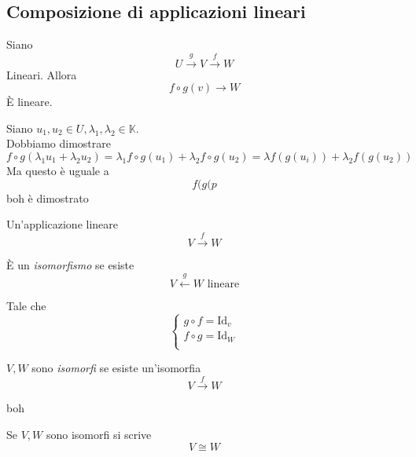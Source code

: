 \subsection{Composizione di applicazioni lineari}

\begin{proprieta}
Siano
\begin{equation}
    U\xrightarrow{g}V\xrightarrow{f}W
\end{equation}
Lineari. Allora
\begin{equation}
    f \circ g(v)\to W
\end{equation}
È lineare.
\end{proprieta}

\begin{dimostrazione}
    Siano $u_{1},u_2 \in U, \lambda_1, \lambda_2\in \mathbb{K}$. \\
    Dobbiamo dimostrare
    \begin{equation}
        f\circ g(\lambda_1u_1 + \lambda_2 u_2) = \lambda_1 f\circ g(u_1)+\lambda_2f\circ g(u_2)=\lambda f(g(u_i))+\lambda_2f(g(u_2))
    \end{equation}
    Ma questo è uguale a
    \begin{equation}
        f(g(p
    \end{equation}
    boh è dimostrato
\end{dimostrazione}

\begin{definizione}

    Un'applicazione lineare
    \begin{equation}
        V \xrightarrow{f} W
    \end{equation}

    È un \textit{isomorfismo} se esiste
    \begin{equation}
        V \xleftarrow{g} W \text{ lineare}
    \end{equation}

    Tale che
    \begin{equation}
        \begin{cases}
            g\circ f= \text{Id}_v \\
            f\circ g= \text{Id}_W \\
        \end{cases}
    \end{equation}
\end{definizione}

\begin{definizione}
    $V,W$ sono \textit{isomorfi} se esiste un'isomorfia
    \begin{equation*}
        V\xrightarrow{f} W
    \end{equation*}
\end{definizione}

\begin{osservazione}
    boh
\end{osservazione}

\begin{notazione}
    Se $V,W$ sono isomorfi si scrive
    \begin{equation}
        V \cong W
    \end{equation}
\end{notazione}


